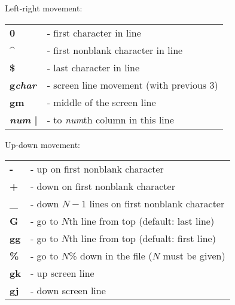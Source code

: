 \documentclass[a4paper,8pt]{extarticle}
\begin{document}
\begin{multicols*}{4}
		\noindent
		Left-right movement:\\
		\begin{tabular}{ l l }
			\textbf{0}			&	- first character in line 							\\
			\textbf{\^}			&	- first nonblank character in line 					\\
			\textbf{\$}			&	- last character in line 							\\
			\textbf{g\textsl{char}}	&	- screen line movement (with previous 3)				\\
			\textbf{gm}			& 	- middle of the screen line 							\\
			\textbf{\textsl{num} |}	&	- to \textsl{num}th column in this line		 			\\
		\end{tabular}

		\noindent
		Up-down movement:\\
		\begin{tabular}{ l l }
			\textbf{-} 			&	- up on first nonblank character						\\
			\textbf{+} 			&	- down on first nonblank character						\\
			\textbf{\_}			&	- down \(N-1\) lines on first nonblank character 			\\
			\textbf{G}			&	- go to \(N\)th line from top (default: last line)		\\
			\textbf{gg}			&	- go to \(N\)th line from top (defualt: first line)		\\
			\textbf{\%}			&	- go to \(N\)\% down in the file (\(N\) must be given)		\\
			\textbf{gk}			&	- up screen line 									\\
			\textbf{gj}			&	- down screen line 									\\
		\end{tabular}

		\columnbreak


\end{multicols*}
\end{document}
